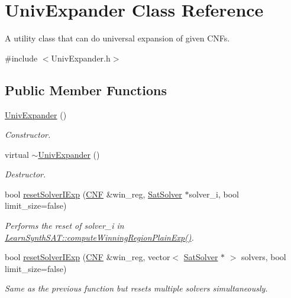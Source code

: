 \hypertarget{classUnivExpander}{\section{Univ\-Expander Class Reference}
\label{classUnivExpander}
}


A utility class that can do universal expansion of given C\-N\-Fs.  




{\ttfamily \#include $<$Univ\-Expander.\-h$>$}

\subsection*{Public Member Functions}
\begin{DoxyCompactItemize}
\item 
\hyperlink{classUnivExpander_abebd87adfae7bb247f6239b3fc0a838e}{Univ\-Expander} ()
\begin{DoxyCompactList}\small\item\em Constructor. \end{DoxyCompactList}\item 
virtual \hyperlink{classUnivExpander_a5b79688ebb811fe8088f9cd762404cfc}{$\sim$\-Univ\-Expander} ()
\begin{DoxyCompactList}\small\item\em Destructor. \end{DoxyCompactList}\item 
bool \hyperlink{classUnivExpander_a1d6935778cefc0b441db0d7f16933a48}{reset\-Solver\-I\-Exp} (\hyperlink{classCNF}{C\-N\-F} \&win\-\_\-reg, \hyperlink{classSatSolver}{Sat\-Solver} $\ast$solver\-\_\-i, bool limit\-\_\-size=false)
\begin{DoxyCompactList}\small\item\em Performs the reset of solver\-\_\-i in \hyperlink{classLearnSynthSAT_a8727927b4e0432acb6bcea883fd2f1f9}{Learn\-Synth\-S\-A\-T\-::compute\-Winning\-Region\-Plain\-Exp()}. \end{DoxyCompactList}\item 
bool \hyperlink{classUnivExpander_a08608ee328b1c0503fb49eec8654e005}{reset\-Solver\-I\-Exp} (\hyperlink{classCNF}{C\-N\-F} \&win\-\_\-reg, vector$<$ \hyperlink{classSatSolver}{Sat\-Solver} $\ast$ $>$ solvers, bool limit\-\_\-size=false)
\begin{DoxyCompactList}\small\item\em Same as the previous function but resets multiple solvers simultaneously. \end{DoxyCompactList}\item 

\end{DoxyCompactItemize}
